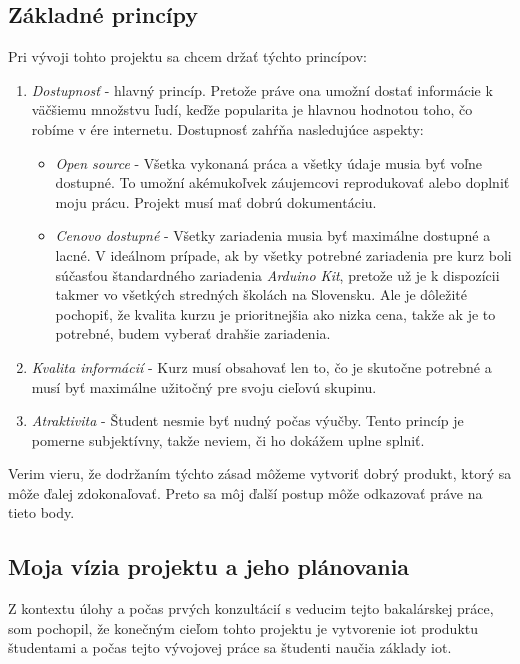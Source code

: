 \subsection{Základné princípy}
Pri vývoji tohto projektu sa chcem držať týchto princípov:
\begin{enumerate}
    \item \textit{Dostupnosť} - hlavný princíp. Pretože práve ona umožní dostať informácie k väčšiemu množstvu ľudí, keďže popularita je hlavnou hodnotou toho, čo robíme v ére internetu. Dostupnosť zahŕňa nasledujúce aspekty:
    \begin{itemize}
        \item \textit{Open source} - Všetka vykonaná práca a všetky údaje musia byť voľne dostupné. To umožní akémukoľvek záujemcovi reprodukovať alebo doplniť moju prácu. Projekt musí mať dobrú dokumentáciu.
        \item \textit{Cenovo dostupné} - Všetky zariadenia musia byť maximálne dostupné a lacné. V ideálnom prípade, ak by všetky potrebné zariadenia pre kurz boli súčasťou štandardného zariadenia \textit{Arduino Kit}, pretože už je k dispozícii takmer vo všetkých stredných školách na Slovensku. Ale je dôležité pochopiť, že kvalita kurzu je prioritnejšia ako nizka cena, takže ak je to potrebné, budem vyberať drahšie zariadenia.
    \end{itemize}
    \item \textit{Kvalita informácií} - Kurz musí obsahovať len to, čo je skutočne potrebné a musí byť maximálne užitočný pre svoju cieľovú skupinu.
    \item \textit{Atraktivita} - Študent nesmie byť nudný počas výučby. Tento princíp je pomerne subjektívny, takže neviem, či ho dokážem uplne splniť.
\end{enumerate}
Verim vieru, že dodržaním týchto zásad môžeme vytvoriť dobrý produkt, ktorý sa môže ďalej zdokonaľovať. Preto sa môj ďalší postup môže odkazovať práve na tieto body.


\subsection{Moja vízia projektu a jeho plánovania}
Z kontextu úlohy a počas prvých konzultácií s veducim tejto bakalárskej práce, som pochopil, že konečným cieľom tohto projektu je vytvorenie \gls{iot} produktu študentami a počas tejto vývojovej práce sa študenti naučia základy \gls{iot}.

